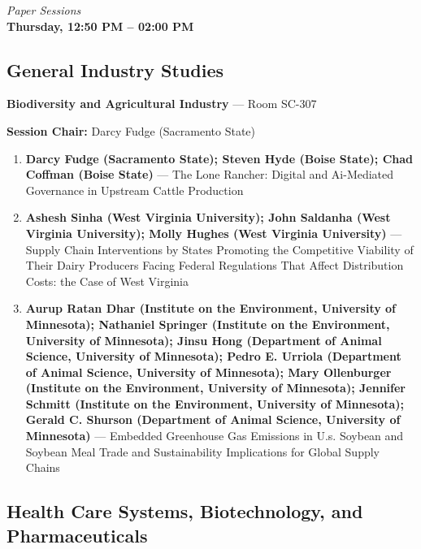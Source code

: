 \documentclass[
  10pt,
  letterpaper,
  DIV=11,
  numbers=noendperiod]{scrartcl}
\begin{document}
\vspace{1em}


\begin{center}
\normalsize\textit{Paper Sessions}\\[0.3em]
\Large\textbf{Thursday, 12:50 PM – 02:00 PM}
\end{center}

\subsection{\texorpdfstring{\textcolor{gis}{General Industry Studies}}{}}\label{section-31}

\textbf{Biodiversity and Agricultural Industry} --- Room SC-307

\textbf{Session Chair:} Darcy Fudge (Sacramento State)

\begin{enumerate}
\def\labelenumi{\arabic{enumi}.}
\item
  \textbf{Darcy Fudge (Sacramento State); Steven Hyde (Boise State);
  Chad Coffman (Boise State)} --- The Lone Rancher: Digital and
  Ai-Mediated Governance in Upstream Cattle Production
\item
  \textbf{Ashesh Sinha (West Virginia University); John Saldanha (West
  Virginia University); Molly Hughes (West Virginia University)} ---
  Supply Chain Interventions by States Promoting the Competitive
  Viability of Their Dairy Producers Facing Federal Regulations That
  Affect Distribution Costs: the Case of West Virginia
\item
  \textbf{Aurup Ratan Dhar (Institute on the Environment, University of
  Minnesota); Nathaniel Springer (Institute on the Environment,
  University of Minnesota); Jinsu Hong (Department of Animal Science,
  University of Minnesota); Pedro E. Urriola (Department of Animal
  Science, University of Minnesota); Mary Ollenburger (Institute on the
  Environment, University of Minnesota); Jennifer Schmitt (Institute on
  the Environment, University of Minnesota); Gerald C. Shurson
  (Department of Animal Science, University of Minnesota)} --- Embedded
  Greenhouse Gas Emissions in U.s. Soybean and Soybean Meal Trade and
  Sustainability Implications for Global Supply Chains
\end{enumerate}

\subsection{\texorpdfstring{\textcolor{health}{Health Care Systems, Biotechnology, and Pharmaceuticals}}{}}\label{section-32}
\end{document}
